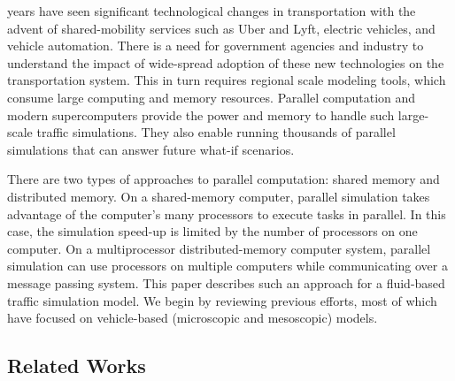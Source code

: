  years have seen significant technological changes in transportation with the advent of shared-mobility services such as Uber and Lyft, electric vehicles, and vehicle automation. There is a need for government agencies and industry to understand the impact of wide-spread adoption of these new technologies on the transportation system. This in turn requires regional scale modeling tools, which consume large computing and memory resources. Parallel computation and modern supercomputers provide the power and memory to handle such large-scale traffic simulations. They also enable running thousands of parallel simulations that can answer future what-if scenarios.

There are two types of approaches to parallel computation: shared memory and distributed memory.
On a shared-memory computer, parallel simulation takes advantage of the computer's many processors to execute tasks in parallel. In this case, the simulation speed-up is limited by the number of processors on one computer. On a multiprocessor distributed-memory computer system, parallel simulation can use processors on multiple computers while communicating over a message passing system. This paper describes such an approach for a fluid-based traffic simulation model. We begin by reviewing previous efforts, most of which have focused on vehicle-based (microscopic and mesoscopic) models. 

\subsection{Related Works}

